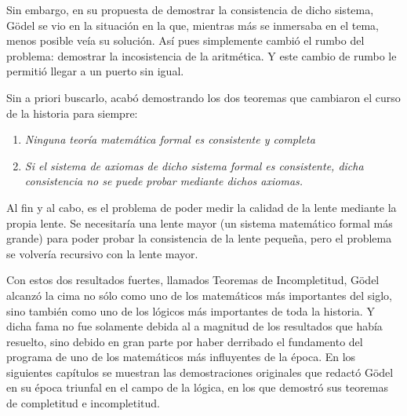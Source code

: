 Sin embargo, en su propuesta de demostrar la consistencia de dicho sistema, Gödel se vio en la situación en la que, mientras más se inmersaba en el tema, menos posible veía su solución. 
Así pues simplemente cambió el rumbo del problema: demostrar la incosistencia de la aritmética. Y este cambio de rumbo le permitió llegar a un puerto sin igual.

Sin a priori buscarlo, acabó demostrando los dos teoremas que cambiaron el curso de la historia para siempre:

\begin{center}
    \begin{enumerate}
        \item \textit{Ninguna teoría matemática formal es consistente y completa}
        \item \textit{Si el sistema de axiomas de dicho sistema formal es consistente, dicha consistencia no se puede probar mediante dichos axiomas.}
    \end{enumerate}
\end{center}

Al fin y al cabo, es el problema de poder medir la calidad de la lente mediante la propia lente. Se necesitaría una lente mayor (un sistema matemático formal más grande) para poder probar
la consistencia de la lente pequeña, pero el problema se volvería recursivo con la lente mayor.

Con estos dos resultados fuertes, llamados Teoremas de Incompletitud, Gödel alcanzó la cima no sólo como uno de los matemáticos más importantes del siglo, sino también como uno de los 
lógicos más importantes de toda la historia. Y dicha fama no fue solamente debida al a magnitud de los resultados que había resuelto, sino debido en gran parte por haber derribado el fundamento
del programa de uno de los matemáticos más influyentes de la época. En los siguientes capítulos se muestran las demostraciones originales que redactó Gödel en su época triunfal en el campo de la lógica,
en los que demostró sus teoremas de completitud e incompletitud.






\endinput
